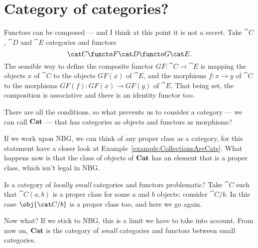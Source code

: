 
\section{Category of categories?}


Functors can be composed --- and I think at this point it is not a
secret. Take \(\cat C\), \(\cat D\) and \(\cat E\) categories and
functors
\[\cat C \functo F \cat D \functo G \cat E .\]
The sensible way to define the composite functor
\(GF : \cat C \to \cat E\) is mapping the objects \(x\) of \(\cat C\) to
the objects \(GF(x)\) of \(\cat E\), and the morphisms \(f : x \to y\)
of \(\cat C\) to the morphisms \(GF(f) : GF(x) \to GF(y)\) of
\(\cat E\). That being set, the composition is associative and there
is an identity functor too.

There are all the conditions, so what prevents us to consider a
category --- we can call \(\bf Cat\) --- that has categories as objects
and functors as morphisms?

If we work upon NBG, we can think of any proper class as a category,
for this statement have a closer look at
Example~\ref{example:CollectionsAreCats}. What happens now is that the
class of objects of \(\bf Cat\) has an element that is a proper class,
which isn't legal in NBG.

Is a category of {\em locally small} categories and functors
problematic? Take \(\cat C\) such that \(\cat C(a, b)\) is a proper
class for some \(a\) and \(b\) objects: consider \(\cat C{/}{b}\). In
this case \(\obj{\cat C/b}\) is a proper class too, and here we go
again.

Now what? If we stick to NBG, this is a limit we have to take into
account. From now on, \(\bf Cat\) is the category of {\em small}
categories and functors between small categories.


